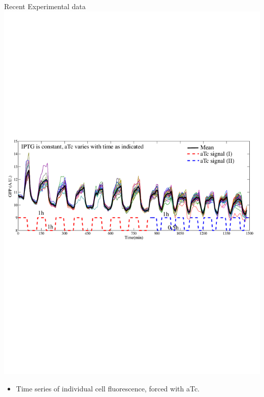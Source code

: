 \documentclass{beamer}
\begin{document}
\begin{frame}{Recent Experimental data}{}
\includegraphics[scale = 0.55, trim = 0 300 0 280 ,clip = true]{../Figures/13_9}
  \begin{itemize}
    \item  Time series of individual cell fluorescence, forced with aTc.
    \end{itemize}
\end{frame}
\end{document}

